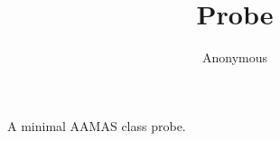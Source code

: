 \documentclass[sigconf,anonymous]{aamas}
\title{Probe}
\author{Anonymous}
\begin{document}
\maketitle
A minimal AAMAS class probe.
\end{document}
